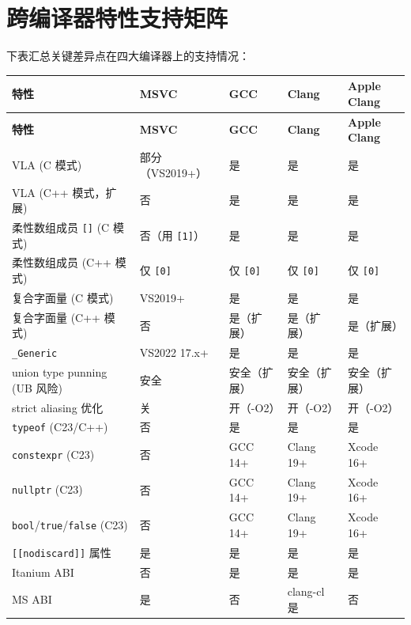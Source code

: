 \documentclass[12pt,a4paper,fontset=fandol]{ctexbook}
\newcommand{\kw}[1]{\texttt{#1}}
\begin{document}
\section{跨编译器特性支持矩阵}

下表汇总关键差异点在四大编译器上的支持情况：

\small
\setlength{\tabcolsep}{4pt}
\begin{longtable}{@{}>{\raggedright\arraybackslash}p{4.0cm} >{\raggedright\arraybackslash}p{2.0cm} >{\raggedright\arraybackslash}p{2.0cm} >{\raggedright\arraybackslash}p{2.0cm} >{\raggedright\arraybackslash}p{2.0cm}@{}}
\toprule
\textbf{特性} & \textbf{MSVC} & \textbf{GCC} & \textbf{Clang} & \textbf{Apple Clang} \\
\midrule
\endfirsthead
\toprule
\textbf{特性} & \textbf{MSVC} & \textbf{GCC} & \textbf{Clang} & \textbf{Apple Clang} \\
\midrule
\endhead
\bottomrule
\endfoot
VLA (C 模式) & 部分（VS2019+） & 是 & 是 & 是 \\
VLA (C++ 模式，扩展) & 否 & 是 & 是 & 是 \\
柔性数组成员 \kw{[]} (C 模式) & 否（用 \kw{[1]}） & 是 & 是 & 是 \\
柔性数组成员 (C++ 模式) & 仅 \kw{[0]} & 仅 \kw{[0]} & 仅 \kw{[0]} & 仅 \kw{[0]} \\
复合字面量 (C 模式) & VS2019+ & 是 & 是 & 是 \\
复合字面量 (C++ 模式) & 否 & 是（扩展） & 是（扩展） & 是（扩展） \\
\kw{\_Generic} & VS2022 17.x+ & 是 & 是 & 是 \\
union type punning (UB 风险) & 安全 & 安全（扩展） & 安全（扩展） & 安全（扩展） \\
strict aliasing 优化 & 关 & 开（-O2） & 开（-O2） & 开（-O2） \\
\kw{typeof} (C23/C++) & 否 & 是 & 是 & 是 \\
\kw{constexpr} (C23) & 否 & GCC 14+ & Clang 19+ & Xcode 16+ \\
\kw{nullptr} (C23) & 否 & GCC 14+ & Clang 19+ & Xcode 16+ \\
\kw{bool}/\allowbreak{}\kw{true}/\allowbreak{}\kw{false} (C23) & 否 & GCC 14+ & Clang 19+ & Xcode 16+ \\
\kw{[[nodiscard]]} 属性 & 是 & 是 & 是 & 是 \\
Itanium ABI & 否 & 是 & 是 & 是 \\
MS ABI & 是 & 否 & clang-cl 是 & 否 \\
\end{longtable}
\normalsize
\end{document}
